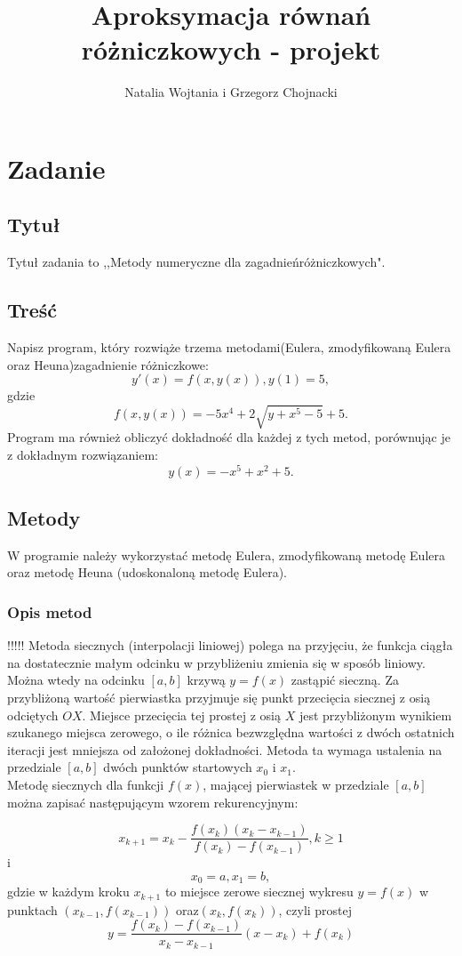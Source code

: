 \documentclass[12pt]{article}
\title{Aproksymacja równań różniczkowych - projekt}
\author{Natalia Wojtania i Grzegorz Chojnacki}
\begin{document}
\maketitle

\section{Zadanie}
\subsection{Tytuł}
Tytuł zadania to ,,Metody numeryczne dla zagadnieńróżniczkowych".
\subsection{Treść}
Napisz program, który rozwiąże trzema metodami(Eulera, zmodyfikowaną Eulera oraz Heuna)zagadnienie różniczkowe: $$y'(x)= f(x,y(x)), y(1)=5,$$ gdzie $$ f(x,y(x))=-5x^4+2 \sqrt{y+x^5-5}+5.$$
Program ma również obliczyć dokładność dla każdej z tych metod, porównując je z dokładnym rozwiązaniem:$$ y(x)=-x^5+x^2+5.$$
\subsection{Metody}
W programie należy wykorzystać metodę Eulera, zmodyfikowaną metodę Eulera oraz metodę Heuna (udoskonaloną metodę Eulera).
\subsubsection{Opis metod}
!!!!!
Metoda siecznych (interpolacji liniowej) polega na przyjęciu, że funkcja ciągła na dostatecznie małym odcinku w przybliżeniu zmienia się w sposób liniowy. Można wtedy na odcinku $[a,b]$ krzywą $y=f(x)$ zastąpić sieczną. Za przybliżoną wartość pierwiastka przyjmuje się punkt przecięcia siecznej z osią odciętych $OX$. Miejsce przecięcia tej prostej z osią $X$ jest przybliżonym wynikiem szukanego miejsca zerowego, o ile różnica bezwzględna wartości z dwóch ostatnich iteracji jest mniejsza od założonej dokładności.  Metoda ta wymaga ustalenia na przedziale $[a,b]$ dwóch punktów startowych $x_0$ i $x_1$.\\
Metodę siecznych dla funkcji $f(x)$, mającej pierwiastek w przedziale $[ a , b ]$ można zapisać następującym wzorem rekurencyjnym:

 $$x_{k+1}=x_k - \frac{f(x_k)(x_k-x_{k-1})}{f(x_k)-f(x_{k-1})}, k \geq 1$$ i $$x_0=a, x_1=b, $$ gdzie w każdym kroku $ x_{k+1}$ to miejsce zerowe siecznej wykresu $y=f(x)$ w punktach $(x_{k-1},f(x_{k-1}))$ oraz$ (x_{k},f(x_{k})) $, czyli prostej $$y=\frac{f(x_k)-f(x_{k-1})}{x_k-x_{k-1}}(x-x_k)+f(x_k)$$
\end{document}
